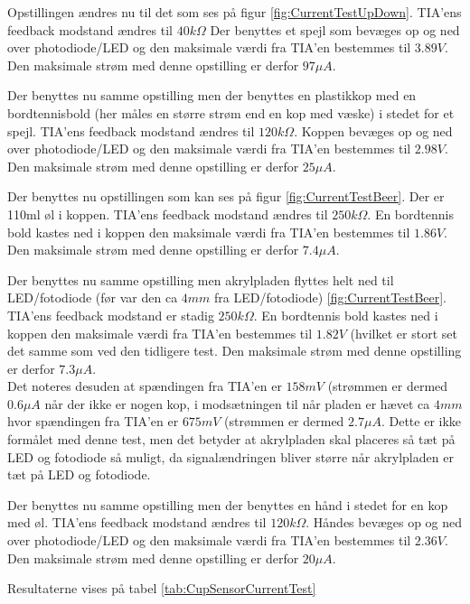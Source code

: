 \documentclass[HardwareDesign/HardwareDesign_main.tex]{subfiles}
\begin{document}
{{Opstillingen ændres nu til det som ses på figur \ref{fig:CurrentTestUpDown}. TIA'ens feedback modstand ændres til $40\si{k\Omega}$ Der benyttes et spejl som bevæges op og ned over photodiode/LED og den maksimale værdi fra TIA'en bestemmes til $3.89\si{V}$. Den maksimale strøm med denne opstilling er derfor $97\si{\mu A}$.

Der benyttes nu samme opstilling men der benyttes en plastikkop med en bordtennisbold (her måles en større strøm end en kop med væske) i stedet for et spejl. TIA'ens feedback modstand ændres til $120\si{k\Omega}$. Koppen bevæges op og ned over photodiode/LED og den maksimale værdi fra TIA'en bestemmes til $2.98\si{V}$. Den maksimale strøm med denne opstilling er derfor $25\si{\mu A}$.

Der benyttes nu opstillingen som kan ses på figur \ref{fig:CurrentTestBeer}. Der er 110ml øl i koppen. TIA'ens feedback modstand ændres til $250\si{k\Omega}$. En bordtennis bold kastes ned i koppen den maksimale værdi fra TIA'en bestemmes til $1.86\si{V}$. Den maksimale strøm med denne opstilling er derfor $7.4\si{\mu A}$.

Der benyttes nu samme opstilling men akrylpladen flyttes helt ned til LED/fotodiode (før var den ca $4\si{mm}$ fra LED/fotodiode) \ref{fig:CurrentTestBeer}. TIA'ens feedback modstand er stadig $250\si{k\Omega}$. En bordtennis bold kastes ned i koppen den maksimale værdi fra TIA'en bestemmes til $1.82\si{V}$ (hvilket er stort set det samme som ved den tidligere test. Den maksimale strøm med denne opstilling er derfor $7.3\si{\mu A}$. \\
Det noteres desuden at spændingen fra TIA'en er $158\si{mV}$ (strømmen er dermed $0.6\si{\mu A}$ når der ikke er nogen kop, i modsætningen til når pladen er hævet ca $4\si{mm}$ hvor spændingen fra TIA'en er $675\si{mV}$ (strømmen er dermed $2.7\si{\mu A}$. Dette er ikke formålet med denne test, men det betyder at akrylpladen skal placeres så tæt på LED og fotodiode så muligt, da signalændringen bliver større når akrylpladen er tæt på LED og fotodiode. 

Der benyttes nu samme opstilling men der benyttes en hånd i stedet for en kop med øl. TIA'ens feedback modstand ændres til $120\si{k\Omega}$. Håndes bevæges op og ned over photodiode/LED og den maksimale værdi fra TIA'en bestemmes til $2.36\si{V}$. Den maksimale strøm med denne opstilling er derfor $20\si{\mu A}$.

Resultaterne vises på tabel \ref{tab:CupSensorCurrentTest}

}}
\end{document}
